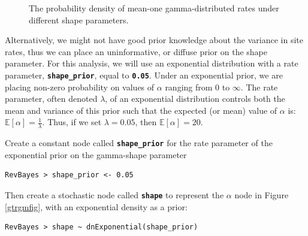 \documentclass[11pt]{article}
\newcommand{\cl}[1]{{\texttt{\textbf{#1}}}}
\begin{document}
\begin{figure}[h]
\centering
{}
\caption{\small The probability density of mean-one gamma-distributed rates under different shape parameters.}
\label{asrhGammaFig}
\end{figure}


Alternatively, we might not have good prior knowledge about the variance in site rates, thus we can place an uninformative, or diffuse prior on the shape parameter.
For this analysis, we will use an exponential distribution with a rate parameter, \cl{shape\_prior}, equal to \cl{0.05}.
Under an exponential prior, we are placing non-zero probability on values of $\alpha$ ranging from 0 to $\infty$. 
The rate parameter, often denoted $\lambda$, of an exponential distribution controls both the mean and variance of this prior such that the expected (or mean) value of $\alpha$ is:
$\mathbb{E}[\alpha] = \frac{1}{\lambda}.$
Thus, if we set $\lambda=0.05$, then $\mathbb{E}[\alpha] = 20$.

Create a constant node called \cl{shape\_prior} for the rate parameter of the exponential prior on the gamma-shape parameter
{\tt\begin{snugshade*}
\begin{lstlisting}
RevBayes > shape_prior <- 0.05                                                                             
\end{lstlisting}
\end{snugshade*}}

Then create a stochastic node called \cl{shape} to represent the $\alpha$ node in Figure \ref{gtrgmfig}, with an exponential density as a prior:
{\tt\begin{snugshade*}
\begin{lstlisting}
RevBayes > shape ~ dnExponential(shape_prior)

\end{lstlisting}
\end{snugshade*}}
\end{document}
